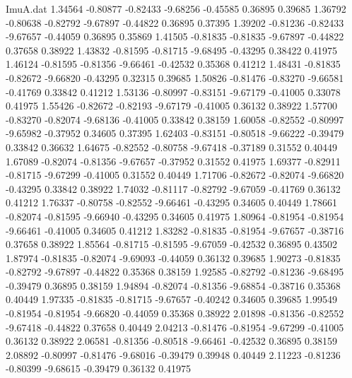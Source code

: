 \begin{filecontents}{ImuA.dat}
   1.34564   -0.80877   -0.82433   -9.68256   -0.45585    0.36895    0.39685
   1.36792   -0.80638   -0.82792   -9.67897   -0.44822    0.36895    0.37395
   1.39202   -0.81236   -0.82433   -9.67657   -0.44059    0.36895    0.35869
   1.41505   -0.81835   -0.81835   -9.67897   -0.44822    0.37658    0.38922
   1.43832   -0.81595   -0.81715   -9.68495   -0.43295    0.38422    0.41975
   1.46124   -0.81595   -0.81356   -9.66461   -0.42532    0.35368    0.41212
   1.48431   -0.81835   -0.82672   -9.66820   -0.43295    0.32315    0.39685
   1.50826   -0.81476   -0.83270   -9.66581   -0.41769    0.33842    0.41212
   1.53136   -0.80997   -0.83151   -9.67179   -0.41005    0.33078    0.41975
   1.55426   -0.82672   -0.82193   -9.67179   -0.41005    0.36132    0.38922
   1.57700   -0.83270   -0.82074   -9.68136   -0.41005    0.33842    0.38159
   1.60058   -0.82552   -0.80997   -9.65982   -0.37952    0.34605    0.37395
   1.62403   -0.83151   -0.80518   -9.66222   -0.39479    0.33842    0.36632
   1.64675   -0.82552   -0.80758   -9.67418   -0.37189    0.31552    0.40449
   1.67089   -0.82074   -0.81356   -9.67657   -0.37952    0.31552    0.41975
   1.69377   -0.82911   -0.81715   -9.67299   -0.41005    0.31552    0.40449
   1.71706   -0.82672   -0.82074   -9.66820   -0.43295    0.33842    0.38922
   1.74032   -0.81117   -0.82792   -9.67059   -0.41769    0.36132    0.41212
   1.76337   -0.80758   -0.82552   -9.66461   -0.43295    0.34605    0.40449
   1.78661   -0.82074   -0.81595   -9.66940   -0.43295    0.34605    0.41975
   1.80964   -0.81954   -0.81954   -9.66461   -0.41005    0.34605    0.41212
   1.83282   -0.81835   -0.81954   -9.67657   -0.38716    0.37658    0.38922
   1.85564   -0.81715   -0.81595   -9.67059   -0.42532    0.36895    0.43502
   1.87974   -0.81835   -0.82074   -9.69093   -0.44059    0.36132    0.39685
   1.90273   -0.81835   -0.82792   -9.67897   -0.44822    0.35368    0.38159
   1.92585   -0.82792   -0.81236   -9.68495   -0.39479    0.36895    0.38159
   1.94894   -0.82074   -0.81356   -9.68854   -0.38716    0.35368    0.40449
   1.97335   -0.81835   -0.81715   -9.67657   -0.40242    0.34605    0.39685
   1.99549   -0.81954   -0.81954   -9.66820   -0.44059    0.35368    0.38922
   2.01898   -0.81356   -0.82552   -9.67418   -0.44822    0.37658    0.40449
   2.04213   -0.81476   -0.81954   -9.67299   -0.41005    0.36132    0.38922
   2.06581   -0.81356   -0.80518   -9.66461   -0.42532    0.36895    0.38159
   2.08892   -0.80997   -0.81476   -9.68016   -0.39479    0.39948    0.40449
   2.11223   -0.81236   -0.80399   -9.68615   -0.39479    0.36132    0.41975

\end{filecontents}
